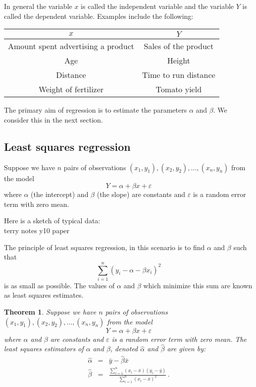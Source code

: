 \documentclass[12pt]{article}
\newtheorem{theorem}{Theorem}[section]
\begin{document}
In general the variable $x$ is called the independent variable and the variable $Y$ is called the dependent variable. Examples include the following:
\begin{center}
\begin{tabular}{|c|c|}
  \hline
  $x$ & $Y$ \\ \hline
  Amount spent advertising a product& Sales of the product \\
  Age & Height \\
  Distance & Time to run distance \\
  Weight of fertilizer & Tomato yield  \\
  \hline
\end{tabular}
\end{center}

The primary aim of regression is to estimate the parameters $\alpha$ and $\beta$. We consider this in the next section.

\subsection{Least squares regression}
Suppose we have $n$ pairs of observations $(x_{1},y_{1}),(x_{2},y_{2}),\dots,(x_{n},y_{n})$  from the model $$Y=\alpha+\beta x +\varepsilon$$
where $\alpha$ (the intercept) and $\beta$ (the slope) are constants and $\varepsilon$ is a random error term with zero mean.



\begin{mdframed}
{Here is a sketch of typical data:}\\
\textcolor[rgb]{1.00,1.00,1.00}{terry notes y10 paper\lipsum[1-3]}
\end{mdframed}

The principle of least squares regression, in this scenario is to find $\alpha$ and $\beta$ such that $$\sum_{i=1}^{n}(y_{i}-\alpha-\beta x_{i})^{2}$$ is as small as possible. The values of $\alpha$ and $\beta$ which minimize this sum are known as least squares estimates.

\begin{theorem}\label{th_reg}
Suppose we have $n$ pairs of observations $(x_{1},y_{1}),(x_{2},y_{2}),\dots,(x_{n},y_{n})$  from the model $$Y=\alpha+\beta x +\varepsilon$$
where $\alpha$ and $\beta$ are constants and $\varepsilon$ is a random error term with zero mean. The least squares estimators of $\alpha$ and $\beta$, denoted $\hat{\alpha}$ and $\hat{\beta}$ are given by:
\begin{eqnarray*}
  \hat{\alpha} &=& \bar{y}-\hat{\beta}\bar{x} \\
  \hat{\beta} &=& \frac{\sum_{i=1}^{n}(x_{i}-\bar{x})(y_{i}-\bar{y})}{\sum_{i=1}^{n}(x_{i}-\bar{x})^{2}}\, .
\end{eqnarray*}
\end{theorem}
\end{document}
